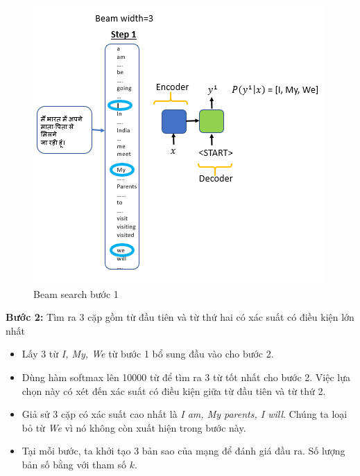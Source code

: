 \documentclass[14pt, a4paper]{article}
\numberwithin{equation}{section}
\numberwithin{algorithm}{section}
\numberwithin{figure}{section}
\numberwithin{table}{section}
\numberwithin{dl}{section}
\numberwithin{md}{section}
\numberwithin{bd}{section}
\numberwithin{dn}{section}
\numberwithin{hq}{section}
\begin{document}
\begin{enumerate} [label=(\alph*)]
        \begin{figure}[h!] \centering

            \includegraphics[scale=0.5]{Beam_search_2.png}
            \caption{Beam search bước 1}
            \label{fig:Beam_search_2}
    
        \end{figure}
        

        \textbf{Bước 2:} Tìm ra 3 cặp gồm từ đầu tiên và từ thứ hai có xác suất có điều kiện lớn nhất

        \begin{itemize}
            \item Lấy 3 từ \textit{I, My, We} từ bước 1 bổ sung đầu vào cho bước 2.
            \item Dùng hàm softmax lên 10000 từ để tìm ra 3 từ tốt nhất cho bước 2. Việc lựa chọn này có xét đến xác suất có điều kiện giữa từ đầu tiên và từ thứ 2.
            \item Giả sử 3 cặp có xác suất cao nhất là \textit{I am, My parents, I will}. Chúng ta loại bỏ từ \textit{We} vì nó không còn xuất hiện trong bước này.
            \item Tại mỗi bước, ta khởi tạo 3 bản sao của mạng để đánh giá đầu ra. Số lượng bản số bằng với tham số $k$.
        \end{itemize}

        \begin{figure}[h!] \centering


\end{figure}
\end{enumerate}
\end{document}

